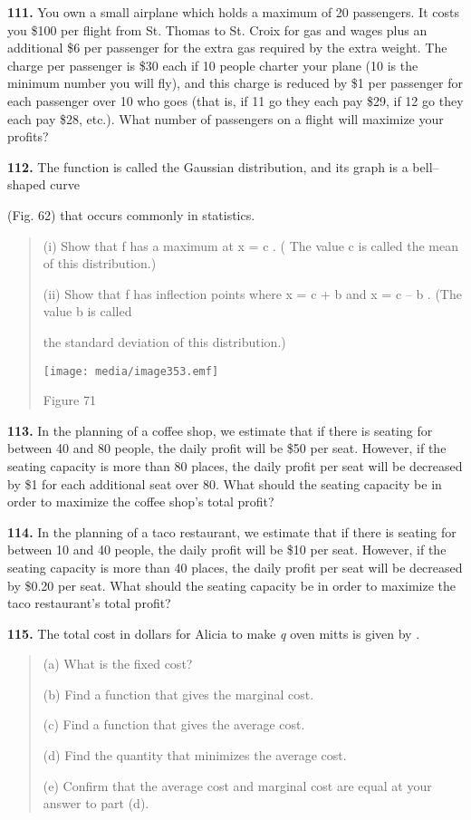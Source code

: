 \textbf{111.} You own a small airplane which holds a maximum of 20
passengers. It costs you \$100 per flight from St. Thomas to St. Croix
for gas and wages plus an additional \$6 per passenger for the extra gas
required by the extra weight. The charge per passenger is \$30 each if
10 people charter your plane (10 is the minimum number you will fly),
and this charge is reduced by \$1 per passenger for each passenger over
10 who goes (that is, if 11 go they each pay \$29, if 12 go they each
pay \$28, etc.). What number of passengers on a flight will maximize
your profits?

\textbf{112.} The function is called the Gaussian distribution, and its
graph is a bell--shaped curve

(Fig. 62) that occurs commonly in statistics.

\begin{quote}
(i) Show that f has a maximum at x = c . ( The value c is called the
mean of this distribution.)

(ii) Show that f has inflection points where x = c + b and x = c -- b .
(The value b is called

the standard deviation of this distribution.)

\texttt{[image: media/image353.emf]}

Figure 71
\end{quote}

\textbf{113.} In the planning of a coffee shop, we estimate that if
there is seating for between 40 and 80 people, the daily profit will be
\$50 per seat. However, if the seating capacity is more than 80 places,
the daily profit per seat will be decreased by \$1 for each additional
seat over 80. What should the seating capacity be in order to maximize
the coffee shop's total profit?

\textbf{114.} In the planning of a taco restaurant, we estimate that if
there is seating for between 10 and 40 people, the daily profit will be
\$10 per seat. However, if the seating capacity is more than 40 places,
the daily profit per seat will be decreased by \$0.20 per seat. What
should the seating capacity be in order to maximize the taco
restaurant's total profit?

\textbf{115.} The total cost in dollars for Alicia to make \emph{q} oven
mitts is given by .

\begin{quote}
(a) What is the fixed cost?

(b) Find a function that gives the marginal cost.

(c) Find a function that gives the average cost.

(d) Find the quantity that minimizes the average cost.

(e) Confirm that the average cost and marginal cost are equal at your
answer to part (d).
\end{quote}

